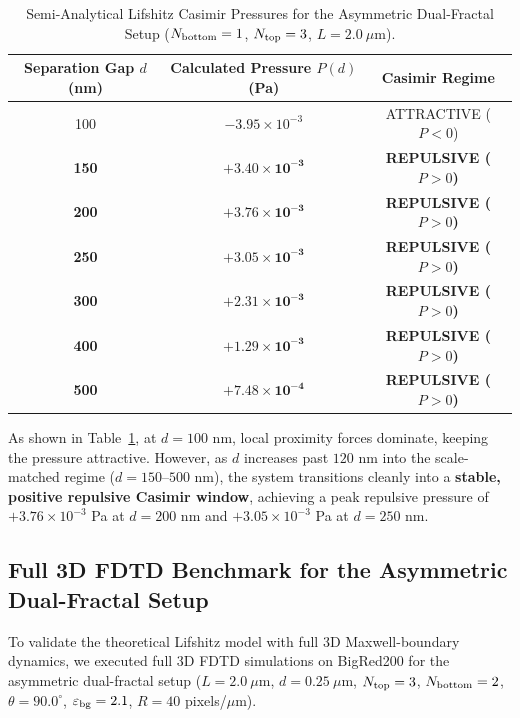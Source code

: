 \documentclass[12pt,letterpaper]{article}
\begin{document}
\begin{table}[htbp]
\centering
\caption{Semi-Analytical Lifshitz Casimir Pressures for the Asymmetric Dual-Fractal Setup ($N_{\rm bottom}=1$, $N_{\rm top}=3$, $L=2.0\ \mu\text{m}$).}
\label{tab:asymmetric_theoretical_pressures}
\begin{tabular}{@{}ccc@{}}
\toprule
\textbf{Separation Gap $d$ (nm)} & \textbf{Calculated Pressure $P(d)$ (Pa)} & \textbf{Casimir Regime} \\
\midrule
100 & $-3.95 \times 10^{-3}$ & ATTRACTIVE ($P < 0$) \\
\textbf{150} & $\mathbf{+3.40 \times 10^{-3}}$ & \textbf{REPULSIVE ($P > 0$)} \\
\textbf{200} & $\mathbf{+3.76 \times 10^{-3}}$ & \textbf{REPULSIVE ($P > 0$)} \\
\textbf{250} & $\mathbf{+3.05 \times 10^{-3}}$ & \textbf{REPULSIVE ($P > 0$)} \\
\textbf{300} & $\mathbf{+2.31 \times 10^{-3}}$ & \textbf{REPULSIVE ($P > 0$)} \\
\textbf{400} & $\mathbf{+1.29 \times 10^{-3}}$ & \textbf{REPULSIVE ($P > 0$)} \\
\textbf{500} & $\mathbf{+7.48 \times 10^{-4}}$ & \textbf{REPULSIVE ($P > 0$)} \\
\bottomrule
\end{tabular}
\end{table}

As shown in Table~\ref{tab:asymmetric_theoretical_pressures}, at $d = 100$ nm, local proximity forces dominate, keeping the pressure attractive. However, as $d$ increases past $120$ nm into the scale-matched regime ($d = 150\text{--}500$ nm), the system transitions cleanly into a \textbf{stable, positive repulsive Casimir window}, achieving a peak repulsive pressure of $+3.76 \times 10^{-3}$ Pa at $d = 200$ nm and $+3.05 \times 10^{-3}$ Pa at $d = 250$ nm.

\subsection{Full 3D FDTD Benchmark for the Asymmetric Dual-Fractal Setup}
To validate the theoretical Lifshitz model with full 3D Maxwell-boundary dynamics, we executed full 3D FDTD simulations on BigRed200 for the asymmetric dual-fractal setup ($L = 2.0\ \mu\text{m}$, $d = 0.25\ \mu\text{m}$, $N_{\rm top} = 3$, $N_{\rm bottom} = 2$, $\theta = 90.0^\circ$, $\varepsilon_{\rm bg} = 2.1$, $R = 40$ pixels/$\mu\text{m}$). 
\end{document}
